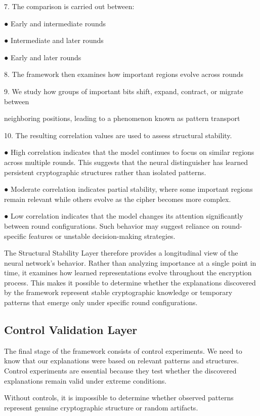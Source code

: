 7.  The comparison is carried out between: 

●  Early and intermediate rounds 

●  Intermediate and later rounds 

●  Early and later rounds 

8.  The framework then examines how important regions evolve across rounds 


9.  We study how groups of important bits shift, expand, contract, or migrate between 

neighboring positions, leading to a phenomenon known as pattern transport 

10. The resulting correlation values are used to assess structural stability. 

●  High correlation indicates that the model continues to focus on similar regions 
across multiple rounds. This suggests that the neural distinguisher has learned 
persistent cryptographic structures rather than isolated patterns. 

●  Moderate correlation indicates partial stability, where some important regions 
remain relevant while others evolve as the cipher becomes more complex. 

●  Low correlation indicates that the model changes its attention significantly 
between round configurations. Such behavior may suggest reliance on 
round-specific features or unstable decision-making strategies. 

The Structural Stability Layer therefore provides a longitudinal view of the neural network's 
behavior. Rather than analyzing importance at a single point in time, it examines how learned 
representations evolve throughout the encryption process. This makes it possible to determine 
whether the explanations discovered by the framework represent stable cryptographic knowledge 
or temporary patterns that emerge only under specific round configurations. 

\subsection{Control Validation Layer}

The final stage of the framework consists of control experiments. We need to know that our 
explanations were based on relevant patterns and structures. Control experiments are essential 
because they test whether the discovered explanations remain valid under extreme conditions. 

Without controls, it is impossible to determine whether observed patterns represent genuine 
cryptographic structure or random artifacts. 

